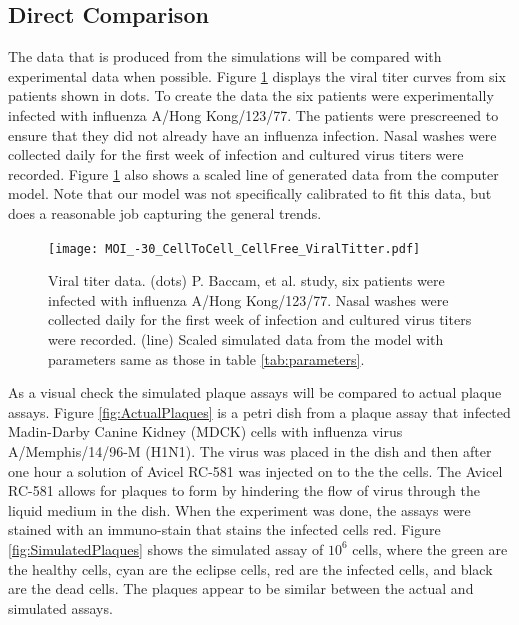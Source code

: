\documentclass[a4paper]{article}
\begin{document}
\subsection{Direct Comparison}
The data that is produced from the simulations will be compared with experimental data when possible. Figure \ref{fig:CurveWithBaccamData} displays the viral titer curves from six patients shown in dots. To create the data the six patients were experimentally infected with influenza A/Hong Kong/123/77. The patients were prescreened to ensure that they did not already have an influenza infection. Nasal washes were collected daily for the first week of infection and cultured virus titers were recorded. Figure \ref{fig:CurveWithBaccamData} also shows a scaled line of generated data from the computer model. Note that our model was not specifically calibrated to fit this data, but does a reasonable job capturing the general trends.

\begin{figure}[h]
    \centering
    \texttt{[image: MOI\_-30\_CellToCell\_CellFree\_ViralTitter.pdf]}
    \caption{Viral titer data. (dots) P. Baccam, et al. study, six patients were infected with influenza A/Hong Kong/123/77. Nasal washes were collected daily for the first week of infection and cultured virus titers were recorded. (line) Scaled simulated data from the model with parameters same as those in table \ref{tab:parameters}.}
    \label{fig:CurveWithBaccamData}
\end{figure}

As a visual check the simulated plaque assays will be compared to actual plaque assays. Figure \ref{fig:ActualPlaques} is a petri dish from a plaque assay that infected Madin-Darby Canine Kidney (MDCK) cells with influenza virus A/Memphis/14/96-M (H1N1). The virus was placed in the dish and then after one hour a solution of Avicel RC-581 was injected on to the the cells. The Avicel RC-581 allows for plaques to form by hindering the flow of virus through the liquid medium in the dish. When the experiment was done, the assays were stained with an immuno-stain that stains the infected cells red. Figure \ref{fig:SimulatedPlaques} shows the simulated assay of $10^{6}$ cells, where the green are the healthy cells, cyan are the eclipse cells, red are the infected cells, and black are the dead cells. The plaques appear to be similar between the actual and simulated assays.
\end{document}
